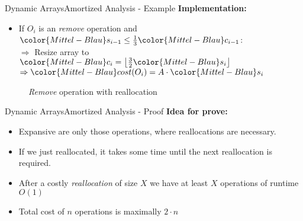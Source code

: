 \begin{frame}{Dynamic Arrays}{Amortized Analysis - Example}
  \textbf{Implementation:}
  \begin{itemize}
    \item
    If {\color{Mittel-Blau}$O_i$} is an \textit{remove} operation and
    ${\color{Mittel-Blau}s_{i-1}}
      \leq \frac{1}{3} {\color{Mittel-Blau}c_{i-1}}$:\\
    $\Rightarrow$ Resize array to
    ${\color{Mittel-Blau}c_i}
      = \left\lfloor\frac{3}{2} {\color{Mittel-Blau}s_i} \right\rfloor$\\
    $\Rightarrow {\color{Mittel-Blau}cost(O_i)}
      = A \cdot {\color{Mittel-Blau}s_i}$
  \end{itemize}
  \begin{figure}[!h]
    \def\FSAsize{12}\def\FSAelements{4}%
    \def\FSAcopy{0}\def\FSAdelete{0}\def\FSAinsert{0}%
    \def\FSAcopyarrow{0}%
    \def\FSAlabelsize{${\color{Mittel-Blau}s_{i-1}} = 4$}%
    \def\FSAlabelcapacity{%
      ${\color{Mittel-Blau}c_{i-1}} = 12%
      \geq {\color{Mittel-Blau}s_{i-1}}$}%
    \hspace*{0.5em}\raisebox{2em}{$\Rightarrow$}\hspace*{0.5em}%
    \def\FSAsize{4}\def\FSAelements{0}%
    \def\FSAcopy{3}\def\FSAdelete{1}\def\FSAinsert{0}%
    \def\FSAlabelsize{${\color{Mittel-Blau}s_i}
      = {\color{Mittel-Blau}s_{i-1}} - 1$}%
    \def\FSAlabelcapacity{${\color{Mittel-Blau}c_i}
      = \frac{3}{2}{\color{Mittel-Blau}s_i}$ = 4}%
    \caption{\textit{Remove} operation with reallocation}
    \label{fig:dynamic_fields:amortized_analysis:remove}
  \end{figure}
\end{frame}


\begin{frame}{Dynamic Arrays}{Amortized Analysis - Proof}
  \textbf{Idea for prove:}
  \begin{itemize}
    \item
      Expansive are only those operations, where reallocations are necessary.
    \item
      If we just reallocated, it takes some time until the next reallocation is required.
    \item
      After a costly \textit{reallocation} of size $X$ we have at least $X$ operations of runtime $O(1)$
    \item
      Total cost of {\color{Mittel-Blau}$n$} operations is maximally {\color{Mittel-Blau}$2 \cdot n$}
  \end{itemize}
\end{frame}

